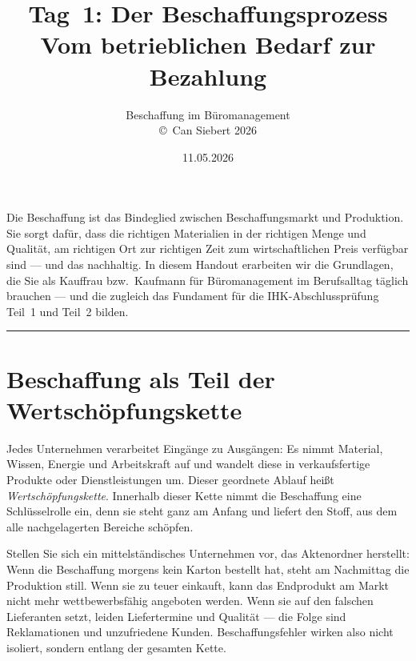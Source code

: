 \documentclass[11pt, a4paper]{article}
\title{\vspace*{-1.5cm}\Huge\bfseries\color{bfwPrimaryDark}Tag~1: Der Beschaffungsprozess\\[0.4em]
  \large\color{bfwInkSoft}\textnormal{Vom betrieblichen Bedarf zur Bezahlung}}
\author{\textsf{Beschaffung im Büromanagement}\\
\textsf{\small\copyright\ Can Siebert\,\textperiodcentered\,2026}}
\date{11.05.2026}
\begin{document}
\maketitle
\thispagestyle{empty}

\vspace{1em}
\begin{merksatz}[title={\bfseries Worum geht es heute?}]
Die Beschaffung ist das Bindeglied zwischen Beschaffungsmarkt und Produktion. Sie sorgt dafür,
dass die richtigen Materialien in der richtigen Menge und Qualität, am richtigen Ort
zur richtigen Zeit zum wirtschaftlichen Preis verfügbar sind --- und das nachhaltig.
In diesem Handout erarbeiten wir die Grundlagen, die Sie als Kauffrau bzw.\ Kaufmann für
Büromanagement im Berufsalltag täglich brauchen --- und die zugleich das Fundament für
die IHK-Abschlussprüfung Teil~1 und Teil~2 bilden.
\end{merksatz}

\tableofcontents
\vspace{1em}
\hrule
\vspace{1em}

\section{Beschaffung als Teil der Wertschöpfungskette}

Jedes Unternehmen verarbeitet Eingänge zu Ausgängen: Es nimmt Material, Wissen, Energie
und Arbeitskraft auf und wandelt diese in verkaufsfertige Produkte oder Dienstleistungen
um. Dieser geordnete Ablauf heißt \emph{Wertschöpfungskette}. Innerhalb dieser Kette
nimmt die Beschaffung eine Schlüsselrolle ein, denn sie steht ganz am Anfang und liefert
den Stoff, aus dem alle nachgelagerten Bereiche schöpfen.

Stellen Sie sich ein mittelständisches Unternehmen vor, das Aktenordner herstellt:
Wenn die Beschaffung morgens kein Karton bestellt hat, steht am Nachmittag die
Produktion still. Wenn sie zu teuer einkauft, kann das Endprodukt am Markt nicht mehr
wettbewerbsfähig angeboten werden. Wenn sie auf den falschen Lieferanten setzt, leiden
Liefertermine und Qualität --- die Folge sind Reklamationen und unzufriedene Kunden.
Beschaffungsfehler wirken also nicht isoliert, sondern entlang der gesamten Kette.
\end{document}
